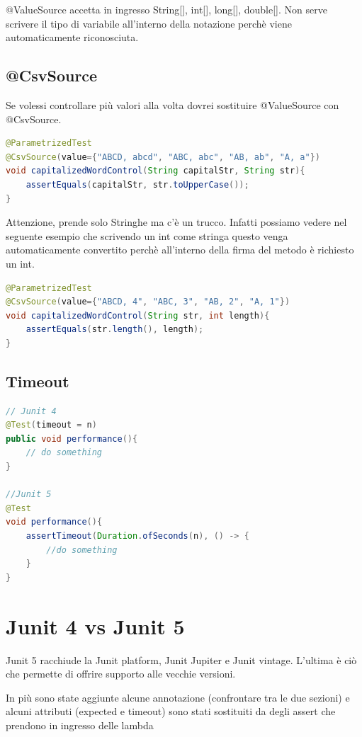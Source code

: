 \documentclass[11pt,a4paper]{book}
\begin{document}
@ValueSource accetta in ingresso String[], int[], long[], double[]. Non serve scrivere il tipo di variabile all'interno della notazione perchè viene automaticamente riconosciuta.

\subsection{@CsvSource}

Se volessi controllare più valori alla volta dovrei sostituire @ValueSource con @CsvSource.
\begin{lstlisting}[language = Java]
@ParametrizedTest
@CsvSource(value={"ABCD, abcd", "ABC, abc", "AB, ab", "A, a"})
void capitalizedWordControl(String capitalStr, String str){
	assertEquals(capitalStr, str.toUpperCase());
}
\end{lstlisting}

Attenzione, prende solo Stringhe ma c'è un trucco. Infatti possiamo vedere nel seguente esempio che scrivendo un int come stringa questo venga automaticamente convertito perchè all'interno della firma del metodo è richiesto un int.
\begin{lstlisting}[language = Java]
@ParametrizedTest
@CsvSource(value={"ABCD, 4", "ABC, 3", "AB, 2", "A, 1"})
void capitalizedWordControl(String str, int length){
	assertEquals(str.length(), length);
}
\end{lstlisting}

\subsection{Timeout}
\begin{lstlisting}[language = Java]
// Junit 4
@Test(timeout = n)
public void performance(){
	// do something
}

//Junit 5
@Test
void performance(){
	assertTimeout(Duration.ofSeconds(n), () -> {
		//do something
	}
}

\end{lstlisting}

\section{Junit 4 vs Junit 5}
Junit 5 racchiude la Junit platform, Junit Jupiter e Junit vintage. L'ultima è ciò che permette di offrire supporto alle vecchie versioni.

In più sono state aggiunte alcune annotazione (confrontare tra le due sezioni) e alcuni attributi (expected e timeout) sono stati sostituiti da degli assert che prendono in ingresso delle lambda
\end{document}
